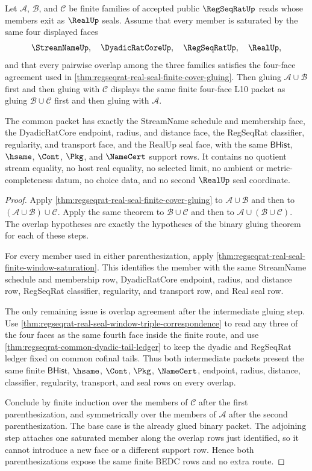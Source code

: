 \begin{theorem}
\label{thm:regseqrat-real-seal-finite-cover-associativity}
Let $\mathcal{A}$, $\mathcal{B}$, and $\mathcal{C}$ be finite families of
accepted public $\RegSeqRatUp$ reads whose members exit as $\RealUp$ seals.
Assume that every member is saturated by the same four displayed faces
$$
\StreamNameUp,\quad \DyadicRatCoreUp,\quad \RegSeqRatUp,\quad \RealUp,
$$
and that every pairwise overlap among the three families satisfies the
four-face agreement used in
\autoref{thm:regseqrat-real-seal-finite-cover-gluing}. Then gluing
$\mathcal{A}\cup\mathcal{B}$ first and then gluing with $\mathcal{C}$ displays
the same finite four-face L10 packet as gluing $\mathcal{B}\cup\mathcal{C}$
first and then gluing with $\mathcal{A}$.

The common packet has exactly the StreamName schedule and membership face, the
DyadicRatCore endpoint, radius, and distance face, the RegSeqRat classifier,
regularity, and transport face, and the RealUp seal face, with the same
$\mathsf{BHist}$, $\hsame$, $\Cont$, $\Pkg$, and $\NameCert$ support rows. It
contains no quotient stream equality, no host real equality, no selected limit,
no ambient or metric-completeness datum, no choice data, and no second
$\RealUp$ seal coordinate.
\end{theorem}
\begin{proof}
Apply
\autoref{thm:regseqrat-real-seal-finite-cover-gluing} to
$\mathcal{A}\cup\mathcal{B}$ and then to
$(\mathcal{A}\cup\mathcal{B})\cup\mathcal{C}$. Apply the same theorem to
$\mathcal{B}\cup\mathcal{C}$ and then to
$\mathcal{A}\cup(\mathcal{B}\cup\mathcal{C})$. The overlap hypotheses are
exactly the hypotheses of the binary gluing theorem for each of these steps.

For every member used in either parenthesization, apply
\autoref{thm:regseqrat-real-seal-finite-window-saturation}. This identifies
the member with the same StreamName schedule and membership row, DyadicRatCore
endpoint, radius, and distance row, RegSeqRat classifier, regularity, and
transport row, and Real seal row.

The only remaining issue is overlap agreement after the intermediate gluing
step. Use
\autoref{thm:regseqrat-real-seal-window-triple-correspondence} to read any
three of the four faces as the same fourth face inside the finite route, and
use \autoref{thm:regseqrat-common-dyadic-tail-ledger} to keep the dyadic and
RegSeqRat ledger fixed on common cofinal tails. Thus both intermediate packets
present the same finite $\mathsf{BHist}$, $\hsame$, $\Cont$, $\Pkg$,
$\NameCert$, endpoint, radius, distance, classifier, regularity, transport,
and seal rows on every overlap.

Conclude by finite induction over the members of $\mathcal{C}$ after the first
parenthesization, and symmetrically over the members of $\mathcal{A}$ after
the second parenthesization. The base case is the already glued binary packet.
The adjoining step attaches one saturated member along the overlap rows just
identified, so it cannot introduce a new face or a different support row. Hence
both parenthesizations expose the same finite BEDC rows and no extra route.
\end{proof}

